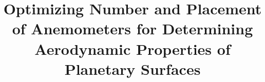 \documentclass[linenumbers]{aastex631}
\begin{document}
\title{Optimizing Number and Placement of Anemometers for Determining Aerodynamic Properties of Planetary Surfaces}


\end{document}
